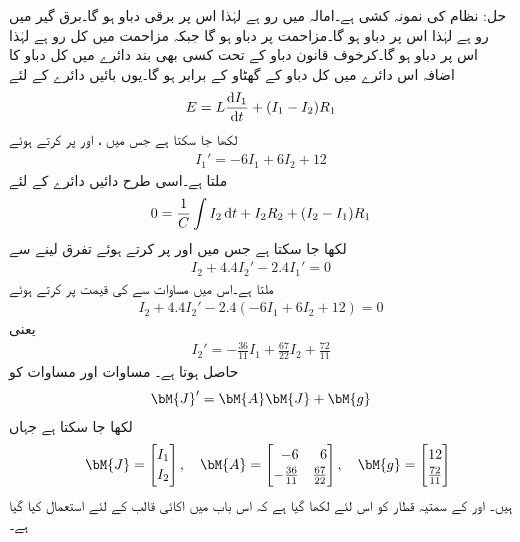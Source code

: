 حل: نظام کی نمونہ کشی ہے۔امالہ میں رو  ہے لہٰذا اس پر برقی دباو  ہو گا۔برق گیر میں رو  ہے لہٰذا اس پر دباو  ہو گا۔مزاحمت  پر دباو  ہو گا جبکہ مزاحمت  میں کل رو  ہے لہٰذا اس پر دباو  ہو گا۔کرخوف قانون دباو کے تحت کسی بھی بند دائرے میں کل دباو کا اضافہ اس دائرے میں کل دباو کے گھٹاو کے برابر ہو گا۔یوں بائیں دائرے کے لئے
\begin{align*}
E=L\frac{\dif I_1}{\dif t}+(I_1-I_2)R_1
\end{align*}
لکھا جا سکتا ہے جس میں ،  اور  پر کرتے ہوئے
\begin{align}\label{مساوات_مثال_برقی_جال_الف}
I_1'=-6I_1+6I_2+12
\end{align}
ملتا ہے۔اسی طرح دائیں دائرے کے لئے
\begin{align*}
0=\frac{1}{C}\int I_2 \dif t+I_2R_2+(I_2-I_1)R_1
\end{align*}
لکھا جا سکتا ہے جس میں  اور  پر کرتے ہوئے تفرق لینے سے
\begin{align*}
I_2+4.4I_2'-2.4I_1'=0
\end{align*}
ملتا ہے۔اس میں مساوات  سے  کی قیمت پر کرتے ہوئے
\begin{align*}
I_2+4.4I_2'-2.4(-6I_1+6I_2+12)=0
\end{align*}
یعنی
\begin{align}\label{مساوات_مثال_برقی_جال_ب}
I_2'=-\frac{36}{11}I_1+\frac{67}{22}I_2+\frac{72}{11}
\end{align}
حاصل ہوتا ہے۔ مساوات  اور مساوات  کو 
\begin{align}\label{مساوات_نظام_برقی_غیر-متجانس_الف}
\bM{J}'=\bM{A} \bM{J}+\bM{g} 
\end{align}
لکھا جا سکتا ہے جہاں 
\begin{align*}
\quad \bM{J}=\begin{bmatrix*}[r] I_1 \\[0.5ex] I_2 \end{bmatrix*},\quad \bM{A}=\begin{bmatrix*}[r] -6 & 6\\[0.5ex] -\frac{36}{11}& \frac{67}{22} \end{bmatrix*}, \quad  \bM{g}=\begin{bmatrix*}[r] 12 \\[0.5ex] \frac{72}{11} \end{bmatrix*}
\end{align*}
ہیں۔ اور  کے  سمتیہ قطار کو  اس لئے لکھا گیا ہے کہ اس باب میں  اکائی قالب کے لئے استعمال کیا گیا ہے۔ 

